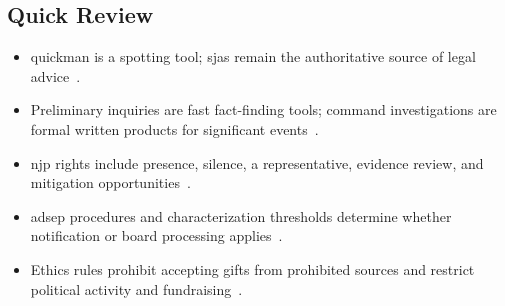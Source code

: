 \documentclass[../main.tex]{subfiles}
\begin{document}
\subsection{Quick Review}
\begin{itemize}
  \item \ac{quickman} is a spotting tool; \acp{sja} remain the authoritative source of legal advice~\autocite{edo-5-1-1-naval-justice-standards-2025}.
  \item Preliminary inquiries are fast fact-finding tools; command investigations are formal written products for significant events~\autocite{edo-5-1-1-naval-justice-standards-2025}.
  \item \ac{njp} rights include presence, silence, a representative, evidence review, and mitigation opportunities~\autocite{edo-5-1-1-naval-justice-standards-2025}.
  \item \ac{adsep} procedures and characterization thresholds determine whether notification or board processing applies~\autocite{edo-5-1-1-naval-justice-standards-2025}.
  \item Ethics rules prohibit accepting gifts from prohibited sources and restrict political activity and fundraising~\autocite{edo-5-1-1-naval-justice-standards-2025,OGE-Standards-Ethical-Conduct-2024,DoD-SOCO-Gifts-Deskbook-2025,DoD-SOCO-Political-Activities-Deskbook-2025,eCFR-5CFR2635-808-Fundraising-2026}.
\end{itemize}

\end{document}
